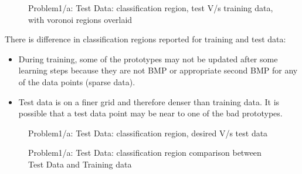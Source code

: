 \documentclass[epsfig]{article}
\begin{document}
\begin{figure}[h!]
	\caption{Problem1/a: Test Data: classification region, test V/s training data, with voronoi regions overlaid}
	\begin{subfigmatrix}{2}
	\end{subfigmatrix}
\end{figure}

There is difference in classification regions reported for training and test data:
\begin{itemize}
	\item During training, some of the prototypes may not be updated after some learning steps because they are not BMP or appropriate second BMP for any of the data points (sparse data).
	\item Test data is on a finer grid and therefore denser than training data. It is possible that a test data point may be near to one of the bad prototypes.
\end{itemize}



\clearpage
\begin{figure}
	\caption{Problem1/a: Test Data: classification region, desired V/s test data}
	\begin{subfigmatrix}{2}
	\end{subfigmatrix}
\end{figure}


\begin{figure}
	\caption{Problem1/a: Test  Data: classification region comparison between Test Data and Training data}
	\begin{subfigmatrix}{2}
	\end{subfigmatrix}
\end{figure}
\end{document}

